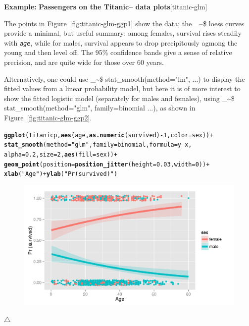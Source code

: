 \documentclass{article}
\makeatletter
\newcommand{\hlnum}[1]{\textcolor[rgb]{0.686,0.059,0.569}{#1}}%
\newcommand{\hlstr}[1]{\textcolor[rgb]{0.192,0.494,0.8}{#1}}%
\newcommand{\hlopt}[1]{\textcolor[rgb]{0,0,0}{#1}}%
\newcommand{\hlstd}[1]{\textcolor[rgb]{0.345,0.345,0.345}{#1}}%
\newcommand{\hlkwc}[1]{\textcolor[rgb]{0.333,0.667,0.333}{#1}}%
\newcommand{\hlkwd}[1]{\textcolor[rgb]{0.737,0.353,0.396}{\textbf{#1}}}%
\newenvironment{kframe}{%
 \def\at@end@of@kframe{}%
 \ifinner\ifhmode%
  \def\at@end@of@kframe{\end{minipage}}%
  \begin{minipage}{\columnwidth}%
 \fi\fi%
 \def\FrameCommand##1{\hskip\@totalleftmargin \hskip-\fboxsep
 \colorbox{shadecolor}{##1}\hskip-\fboxsep
     \hskip-\linewidth \hskip-\@totalleftmargin \hskip\columnwidth}%
 \MakeFramed {\advance\hsize-\width
   \@totalleftmargin\z@ \linewidth\hsize
   \@setminipage}}%
 {\par\unskip\endMakeFramed%
 \at@end@of@kframe}
\newenvironment{knitrout}{}{} %
\newcommand{\figref}[1]{Figure~\ref{#1}}
\newcommand{\var}[1]{\textit{\texttt{#1}}}
\newcommand\code{\bgroup\@makeother\_\@makeother\~\@makeother\$\@codex}
\def\@codex#1{{\normalfont\ttfamily\hyphenchar\font=-1 #1}\egroup}
\newenvironment{Example}[2][unnamed-example]%
  {\medskip\noindent\textbf{\textsf{Example:}}
   \textbf{#2}\hfill [#1]\par\smallskip
  }
  {\hfill $\triangle$}
\makeatother
\begin{document}
\begin{Example}[titanic-glm]{Passengers on the Titanic-- data plots}
\begin{knitrout}
\end{knitrout}

The points in \figref{fig:titanic-glm-ggp1} show the data; the \code{loess}
curves provide a minimal, but useful summary: among females, survival
rises steadily with \var{age}, while for males, survival appears to
drop precipitously agmong the young and then level off.  The 95\% confidence
bands give a sense of relative precision, and are quite wide for those
over 60 years.

Alternatively, one could use \code{stat\_smooth(method="lm", ...)}
to display the fitted values from a linear probability model,
but here it is of more interest to show the fitted logistic model
(separately for males and females), using
\code{stat\_smooth(method="glm", family=binomial ...)}, as shown in
\figref{fig:titanic-glm-ggp2}.

\begin{knitrout}
\color{fgcolor}\begin{kframe}
\begin{alltt}
\hlkwd{ggplot}\hlstd{(Titanicp,} \hlkwd{aes}\hlstd{(age,} \hlkwd{as.numeric}\hlstd{(survived)}\hlopt{-}\hlnum{1}\hlstd{,} \hlkwc{color}\hlstd{=sex))} \hlopt{+}
  \hlkwd{stat_smooth}\hlstd{(}\hlkwc{method}\hlstd{=}\hlstr{"glm"}\hlstd{,} \hlkwc{family}\hlstd{=binomial,} \hlkwc{formula}\hlstd{=y}\hlopt{~}\hlstd{x,}
              \hlkwc{alpha}\hlstd{=}\hlnum{0.2}\hlstd{,} \hlkwc{size}\hlstd{=}\hlnum{2}\hlstd{,} \hlkwd{aes}\hlstd{(}\hlkwc{fill}\hlstd{=sex))} \hlopt{+}
  \hlkwd{geom_point}\hlstd{(}\hlkwc{position}\hlstd{=}\hlkwd{position_jitter}\hlstd{(}\hlkwc{height}\hlstd{=}\hlnum{0.03}\hlstd{,} \hlkwc{width}\hlstd{=}\hlnum{0}\hlstd{))} \hlopt{+}
  \hlkwd{xlab}\hlstd{(}\hlstr{"Age"}\hlstd{)} \hlopt{+} \hlkwd{ylab}\hlstd{(}\hlstr{"Pr (survived)"}\hlstd{)}
\end{alltt}
\end{kframe}\begin{figure}[hb]


{\centering \includegraphics[width=.6\linewidth]{figure/titanic-glm-ggp2} 

}
\end{figure}
\end{knitrout}
\end{Example}
\end{document}

